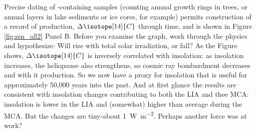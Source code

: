 \documentclass[amstex,12pt]{book}
\begin{document}
Precise dating of -containing samples (counting annual growth rings in trees, or annual layers in lake sediments or ice cores, for example) permits construction of a record of  production, $\Delta\isotope[14]{C}$ through time, and is shown in Figure \ref{fig:ssn_all2} Panel B. Before you examine the graph, work through the physics and hypothesize: Will  rise with total solar irradiation, or fall? As the Figure shows, $\Delta\isotope[14]{C}$ is inversely correlated with insolation: as insolation increases, the heliopause also strengthens, so cosmic ray bombardment decreases and with it  production. So we now have a proxy for insolation that is useful for approximately 50,000 years into the past. And at first glance the results are consistent with insolation changes contributing to both the LIA and thee MCA: insolation is lower in the LIA and (somewhat) higher than average during the MCA. But the changes are tiny-about \SI{1}{\watt\per\metre\squared}. Perhaps another force was at work? 
\end{document}
